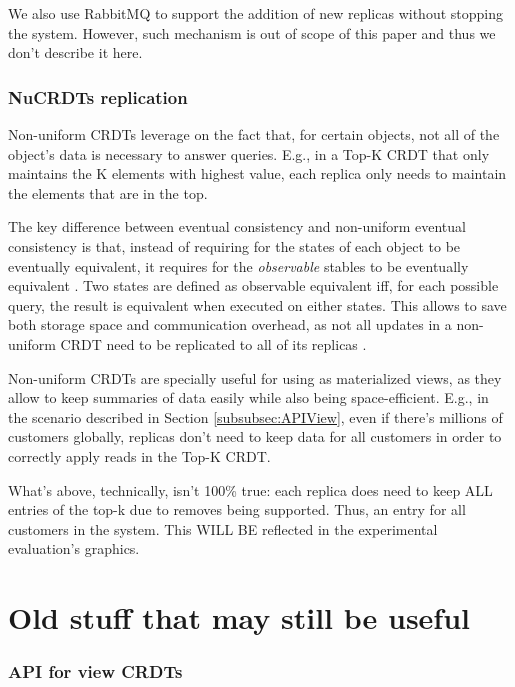 \documentclass{vldb}
\newcommand{\grumbler}[2]{{\color{red}{\bf #1:} #2}}
\newcommand{\andre}[1]{\grumbler{andre}{#1}}
\begin{document}
We also use RabbitMQ to support the addition of new replicas without stopping the system.
However, such mechanism is out of scope of this paper and thus we don't describe it here.

\subsubsection{NuCRDTs replication}
\label{subsubsec:nureplication}

Non-uniform CRDTs \cite{???} leverage on the fact that, for certain objects, not all of the object's data is necessary to answer queries.
E.g., in a Top-K CRDT that only maintains the K elements with highest value, each replica only needs to maintain the elements that are in the top.

The key difference between eventual consistency and non-uniform eventual consistency is that, instead of requiring for the states of each object to be eventually equivalent, it requires for the \emph{observable} stables to be eventually equivalent \cite{???}.
Two states are defined as observable equivalent iff, for each possible query, the result is equivalent when executed on either states.
This allows to save both storage space and communication overhead, as not all updates in a non-uniform CRDT need to be replicated to all of its replicas \cite{???}.

Non-uniform CRDTs are specially useful for using as materialized views, as they allow to keep summaries of data easily while also being space-efficient.
E.g., in the scenario described in Section \ref{subsubsec:APIView}, even if there's millions of customers globally, replicas don't need to keep data for all customers in order to correctly apply reads in the Top-K CRDT.

\andre{What's above, technically, isn't 100\% true: each replica does need to keep ALL entries of the top-k due to removes being supported. Thus, an entry for all customers in the system. This WILL BE reflected in the experimental evaluation's graphics.}

\section{Old stuff that may still be useful}

\subsubsection{API for view CRDTs}
\end{document}

